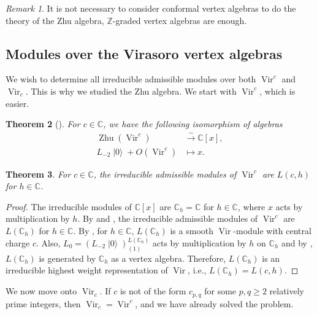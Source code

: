 \documentclass[a4paper, 12pt, reqno]{amsart}
\newtheorem{theorem}{Theorem}[section]
\theoremstyle{remark}
\newtheorem{remark}[theorem]{Remark}
\numberwithin{equation}{subsection}
\DeclareMathOperator{\Vir}{Vir}
\DeclareMathOperator{\vac}{|0\rangle}
\DeclareMathOperator{\Zhu}{Zhu}
\begin{document}
\begin{remark}
  \label{rmk:34}
  It is not necessary to consider conformal vertex algebras to do the theory of the Zhu algebra, $\mathbb{Z}$-graded vertex algebras are enough.
\end{remark}

\subsection{Modules over the Virasoro vertex algebras}
\label{sec:modul-over-viras}

We wish to determine all irreducible admissible modules over both $\Vir^c$ and $\Vir_c$.
This is why we studied the Zhu algebra.
We start with $\Vir^c$, which is easier.

\begin{theorem}[{\cite{wang_rationality_1993}}]
  \label{thr:40}
  For $c \in \mathbb{C}$, we have the following isomorphism of algebras
  \begin{align*}
    \Zhu(\Vir^c) &\xrightarrow{\sim} \mathbb{C}[x], \\
    L_{-2}\vac + O(\Vir^c) &\mapsto x.
  \end{align*}
\end{theorem}

\begin{theorem}
  \label{thr:41}
  For $c \in \mathbb{C}$, the irreducible admissible modules of $\Vir^c$ are $L(c, h)$ for $h \in \mathbb{C}$.
\end{theorem}

\begin{proof}
  The irreducible modules of $\mathbb{C}[x]$ are $\mathbb{C}_h = \mathbb{C}$ for $h \in \mathbb{C}$, where $x$ acts by multiplication by $h$.
  By  and , the irreducible admissible modules of $\Vir^c$ are $L(\mathbb{C}_h)$ for $h \in \mathbb{C}$.
  By , for $h \in \mathbb{C}$, $L(\mathbb{C}_h)$ is a smooth $\Vir$-module with central charge $c$.
  Also, $L_0 = (L_{-2}\vac)^{L(\mathbb{C}_h)}_{(1)}$ acts by multiplication by $h$ on $\mathbb{C}_h$ and by , $L(\mathbb{C}_h)$ is generated by $\mathbb{C}_h$ as a vertex algebra.
  Therefore, $L(\mathbb{C}_h)$ is an irreducible highest weight representation of $\Vir$, i.e., $L(\mathbb{C}_h) = L(c, h)$.
\end{proof}

We now move onto $\Vir_c$.
If $c$ is not of the form $c_{p, q}$ for some $p, q \ge 2$ relatively prime integers, then $\Vir_c = \Vir^c$, and we have already solved the problem.
\end{document}
